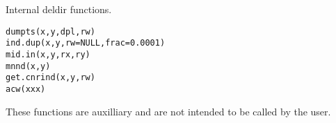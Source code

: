 \begin{Description}\relax
Internal deldir functions.
\end{Description}
\begin{Usage}
\begin{verbatim}
dumpts(x,y,dpl,rw)
ind.dup(x,y,rw=NULL,frac=0.0001)
mid.in(x,y,rx,ry)
mnnd(x,y)
get.cnrind(x,y,rw)
acw(xxx)
\end{verbatim}
\end{Usage}
\begin{Details}\relax
These functions are auxilliary and are not intended to be called by
the user.
\end{Details}

